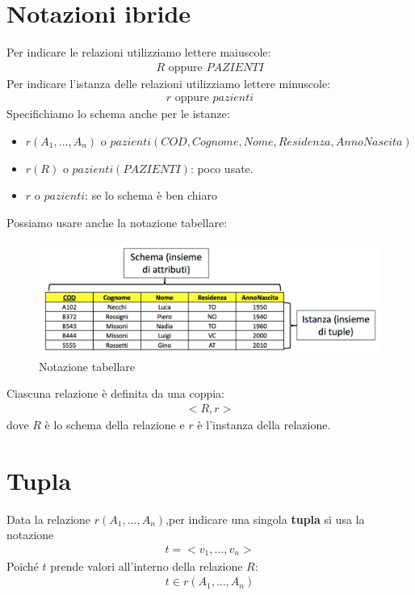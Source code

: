 \section{Notazioni ibride}
Per indicare le relazioni utilizziamo lettere maiuscole:
    \begin{equation}\begin{aligned}
        R \text{ oppure } PAZIENTI
    \end{aligned}\end{equation}
Per indicare l'istanza delle relazioni utilizziamo lettere minuscole:
    \begin{equation}\begin{aligned}
        r \text{ oppure } pazienti
    \end{aligned}\end{equation}
Specifichiamo lo schema anche per le istanze:
    \begin{itemize}
        \item{$r(A_1, ..., A_n)$ o $pazienti(COD, Cognome, Nome, Residenza, AnnoNascita)$}
        \item{$r(R)$ o $pazienti(PAZIENTI)$: poco usate.}
        \item{$r$ o $pazienti$: se lo schema è ben chiaro}
    \end{itemize}
Possiamo usare anche la notazione tabellare:
    \begin{figure}[h!]
        \centering
        \includegraphics[scale = 0.5]{01/img01}
        \caption{Notazione tabellare}
    \end{figure}
Ciascuna relazione è definita da una coppia:
    \begin{equation}\begin{aligned}
        <R, r>
    \end{aligned}\end{equation}
dove $R$ è lo schema della relazione e $r$ è l'instanza della relazione.

\section{Tupla}
Data la relazione $r(A_1, ..., A_n)$,per indicare una singola \textbf{tupla} si usa la notazione
    \begin{equation}\begin{aligned}
        t = <v_1, ..., v_n>
    \end{aligned}\end{equation}
Poiché $t$ prende valori all'interno della relazione $R$:
    \begin{equation}\begin{aligned}
        t \in r (A_1, ..., A_n)
    \end{aligned}\end{equation}
    
